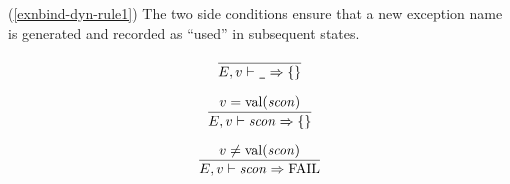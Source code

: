 \replacement{\theidstatus}{
\begin{equation}	%
\frac{\E(\longexn)=\e\qquad
      \langle\E\ts\exnbind\ra\EE\rangle }
     {\E\ts\longexnbindb\ra\{\exn\mapsto\e\}\langle +\ \EE\rangle}
\end{equation}}{\begin{equation}	%
\frac{\E(\longvid)=(\e,\ise)\qquad
      \langle\E\ts\exnbind\ra\VE\rangle }
     {\E\ts\longvidexnbindb\ra\{\vid\mapsto(\e,\ise)\}\langle +\ \VE\rangle}
\end{equation}}
\comments
\begin{description}
\item{(\ref{exnbind-dyn-rule1})}
  The two side conditions ensure that a new exception name is generated and 
recorded as ``used'' in subsequent states.
\end{description}
%
%
\begin{equation}	%
\frac{}
     {\E,\V\ts\wildpat\ra \emptymap}\index{55.3}
\end{equation}

\begin{equation}	%
\frac{\V=\sconval(\scon)}
     {\E,\V\ts\scon\ra \emptymap}\index{55.35}
\end{equation}

\begin{equation}	%
\label{sconpat-dyn-rule2}
\frac{\V\neq\sconval(\scon)}
     {\E,\V\ts\scon\ra \FAIL}\index{55.36}
\end{equation}




